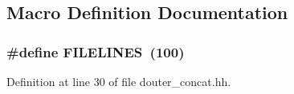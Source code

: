 \subsection{Macro Definition Documentation}
\hypertarget{douter__concat_8hh_ad3b770b661fc5cdd44d05e924cd76a12}{
\subsubsection[{F\+I\+L\+E\+L\+I\+N\+E\+S}]{\setlength{\rightskip}{0pt plus 5cm}\#define F\+I\+L\+E\+L\+I\+N\+E\+S~(100)}}\label{douter__concat_8hh_ad3b770b661fc5cdd44d05e924cd76a12}


Definition at line 30 of file douter\+\_\+concat.\+hh.

